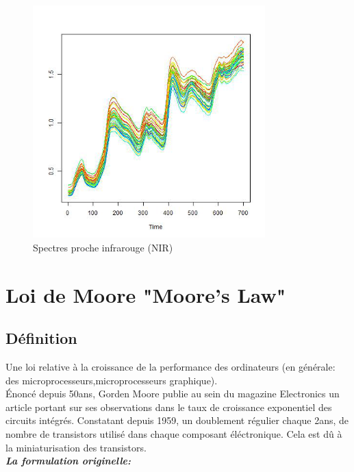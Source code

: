 \documentclass[11pt,twoside,openany,x11names,svgnames]{memoir}
\begin{document}
\begin{itemize}
\begin{figure}[h]
	\centering
		\includegraphics[width=0.80\textwidth]{imageee.png}
	\caption{ Spectres proche infrarouge (NIR)}
	\label{fig:imageee}
\end{figure}


				
				
\chapter{Loi de Moore "Moore's Law"}
		\section{Définition}
		Une loi relative à la croissance de la performance des ordinateurs (en générale: des microprocesseurs,microprocesseurs graphique). \\
		\'Enoncé depuis 50ans, Gorden Moore publie au sein du magazine Electronics un article portant sur ses observations dans le taux de croissance exponentiel des circuits intégrés. Constatant depuis 1959, un doublement régulier chaque 2ans, de nombre de transistors utilisé dans chaque composant éléctronique. Cela est d\^u à la miniaturisation des transistors. \\
		\textbf{\textsl{La formulation originelle:}}
	

\end{itemize}
\end{document}
